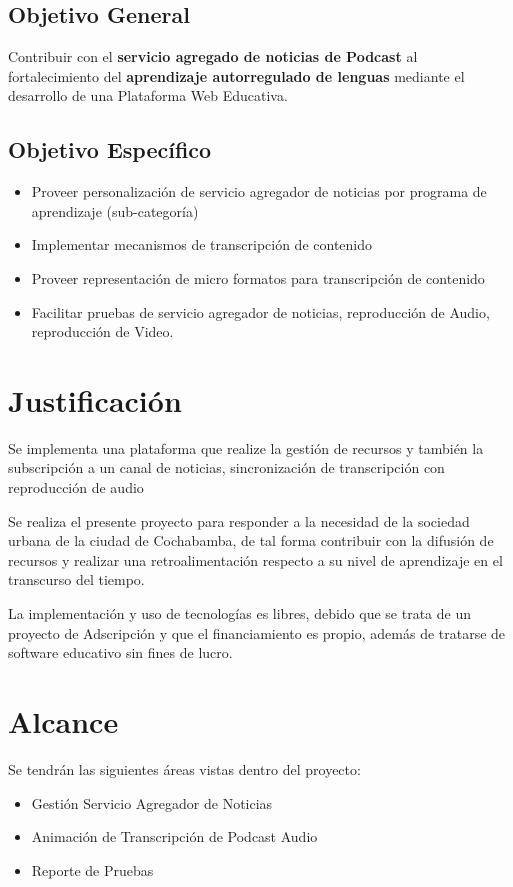 \subsection{Objetivo General}

Contribuir con el \textbf{servicio agregado de noticias de Podcast} al 
fortalecimiento del \textbf{aprendizaje autorregulado de lenguas} mediante el 
desarrollo de una Plataforma Web Educativa.

\subsection{Objetivo Espec\'{i}fico}

\begin{itemize}

\item Proveer personalizaci\'{o}n de servicio agregador de noticias por programa de
aprendizaje (sub-categor\'{i}a)

\item Implementar mecanismos de transcripci\'{o}n de contenido

\item Proveer representaci\'{o}n de micro formatos para transcripci\'{o}n de contenido

\item Facilitar pruebas de servicio agregador de noticias, reproducci\'{o}n de
Audio, reproducci\'{o}n de Video.

\end{itemize}

\section{Justificaci\'{o}n}

Se implementa una plataforma que realize la gesti\'{o}n de recursos y tambi\'{e}n la
subscripci\'{o}n a un canal de noticias, sincronizaci\'{o}n de transcripci\'{o}n
con reproducci\'{o}n de audio

Se realiza el presente proyecto para responder a la necesidad de la sociedad 
urbana de la ciudad de Cochabamba, de tal forma contribuir con la difusi\'{o}n
de recursos y realizar una retroalimentaci\'{o}n respecto a su nivel de 
aprendizaje en el transcurso del tiempo.

La implementaci\'{o}n y uso de tecnolog\'{i}as es libres, debido que se trata 
de un proyecto de Adscripci\'{o}n y que el financiamiento es propio, adem\'{a}s
de tratarse de software educativo sin fines de lucro.

\section{Alcance}

Se tendr\'{a}n las siguientes \'{a}reas vistas dentro del proyecto:

\begin{itemize}

\item Gesti\'{o}n Servicio Agregador de Noticias
\item Animaci\'{o}n de Transcripci\'{o}n de Podcast Audio
\item Reporte de Pruebas

\end{itemize}